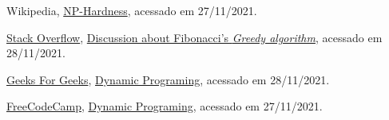 \begin{thebibliography}{10}

  Wikipedia,
  \href{https://en.wikipedia.org/wiki/NP-hardness}{NP-Hardness},
  acessado em 27/11/2021.
  
  \href{https://stackoverflow.com/}{Stack Overflow},
  \href{https://stackoverflow.com/questions/52869474/implementing-fibonacci-series-using-greedy-approach}{Discussion about Fibonacci's \emph{Greedy algorithm}},
  acessado em 28/11/2021. 
  
  \href{https://www.geeksforgeeks.org/}{Geeks For Geeks},
  \href{https://www.geeksforgeeks.org/dynamic-programming/}{Dynamic Programing},
  acessado em 28/11/2021.
  
    \href{https://www.freecodecamp.org}{FreeCodeCamp},
    \href{https://youtu.be/oBt53YbR9Kk?t=210}{Dynamic Programing},
    acessado em 27/11/2021.
  
\end{thebibliography}